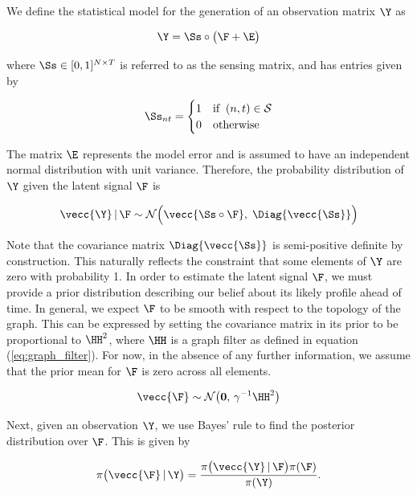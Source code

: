 We define the statistical model for the generation of an observation matrix $\Y$ as 

\begin{equation}
    \Y = \Ss \circ \big(\F + \E \big)
\end{equation}

where $\Ss \in [0, 1]^{N \times T}$ is referred to as the sensing matrix, and has entries given by 

\begin{equation}
    \Ss_{nt} = \begin{cases}
        1 & \text{if} \;\; (n, t) \in \mathcal{S} \\
        0 & \text{otherwise}
    \end{cases}
\end{equation}

The matrix $\E$ represents the model error and is assumed to have an independent normal distribution with unit variance. Therefore, the probability distribution of $\Y$ given the latent signal $\F$ is

\begin{equation}
    \label{eq:Y_given_F}
    \vecc{\Y} \, | \, \F \sim \mathcal{N}\Big(\vecc{\Ss \circ \F}, \; \Diag{\vecc{\Ss}}\Big)
\end{equation}

Note that the covariance matrix $\Diag{\vecc{\Ss}}$ is semi-positive definite by construction. This naturally reflects the constraint that some elements of $\Y$ are zero with probability 1. In order to estimate the latent signal $\F$, we must provide a prior distribution describing our belief about its likely profile ahead of time. In general, we expect $\F$ to be smooth with respect to the topology of the graph. This can be expressed by setting the covariance matrix in its prior to be proportional to $\HH^2$, where $\HH$ is a graph filter as defined in equation (\ref{eq:graph_filter}). For now, in the absence of any further information, we assume that the prior mean for $\F$ is zero across all elements. 

\begin{equation}
    \label{eq:F_prior}
    \vecc{\F} \sim \mathcal{N}\big(\mathbf{0}, \, \gamma^{-1} \HH^2\big) 
\end{equation}

Next, given an observation $\Y$, we use Bayes' rule to find the posterior distribution over $\F$. This is given by

\begin{equation}
    \pi\big(\vecc{\F} \, | \, \Y \big) = \frac{\pi\big(\vecc{\Y} \, | \, \F \big) \pi(\F) }{\pi(\Y)}.
\end{equation}

